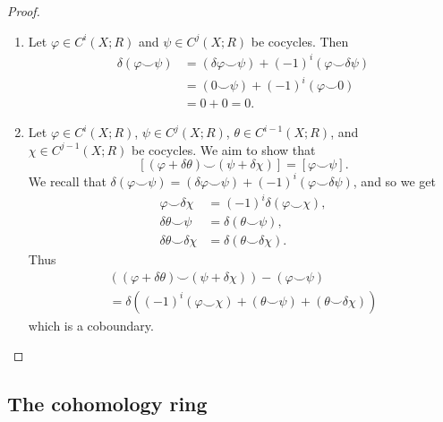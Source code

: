 \begin{proof}
    \hspace{0em}
    \begin{enumerate}
        \item Let $\varphi \in C^i(X;R)$ and $\psi \in C^j(X;R)$ be cocycles. Then
              \begin{align*}
                  \delta(\varphi \smile \psi)
                   & = (\delta\varphi \smile \psi) + (-1)^i (\varphi \smile \delta\psi) \\
                   & = (0 \smile \psi) + (-1)^i(\varphi \smile 0)                       \\
                   & = 0 + 0 = 0.
              \end{align*}
        \item Let $\varphi \in C^i(X;R)$, $\psi \in C^j(X;R)$, $\theta \in C^{i-1}(X; R)$, and $\chi \in C^{j-1}(X;R)$ be cocycles. We aim to show that \[
                  [(\varphi + \delta\theta) \smile (\psi + \delta\chi)] = [\varphi \smile \psi].
              \]
              We recall that $\delta(\varphi \smile \psi) = (\delta\varphi \smile \psi) + (-1)^i (\varphi \smile \delta\psi)$, and so we get
              \begin{align*}
                  \varphi \smile \delta\chi      & = (-1)^i \delta(\varphi \smile \chi), \\
                  \delta\theta \smile \psi       & = \delta(\theta \smile \psi),         \\
                  \delta\theta \smile \delta\chi & = \delta(\theta \smile \delta\chi).
              \end{align*}
              Thus \begin{align*}
                  \left((\varphi + \delta\theta) \smile (\psi + \delta\chi)\right) - (\varphi \smile \psi)
                  \\ = \delta\left((-1)^i(\varphi \smile \chi) + (\theta \smile \psi) + (\theta \smile \delta\chi)\right)
              \end{align*}
              which is a coboundary. \qedhere
    \end{enumerate}
\end{proof}


\subsection{The cohomology ring}

